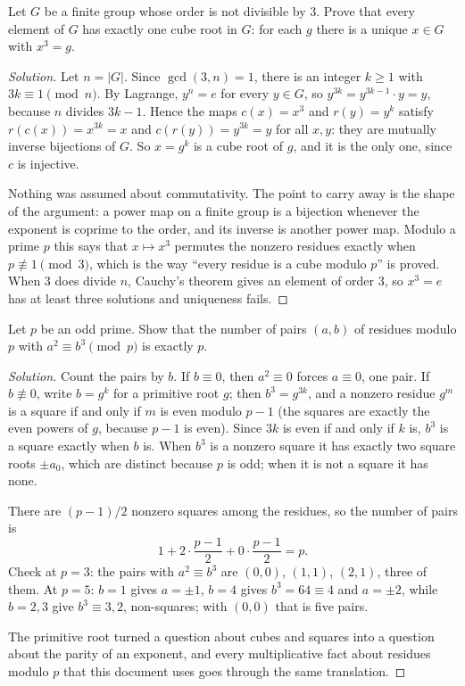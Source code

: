 \begin{example}
Let $G$ be a finite group whose order is not divisible by $3$. Prove that every element of $G$ has exactly one cube root in $G$: for each $g$ there is a unique $x\in G$ with $x^3=g$.
\end{example}

\begin{proof}[Solution]
Let $n=|G|$. Since $\gcd(3,n)=1$, there is an integer $k\ge1$ with $3k\equiv1\pmod n$. By Lagrange, $y^n=e$ for every $y\in G$, so $y^{3k}=y^{3k-1}\cdot y=y$, because $n$ divides $3k-1$. Hence the maps $c(x)=x^3$ and $r(y)=y^k$ satisfy $r(c(x))=x^{3k}=x$ and $c(r(y))=y^{3k}=y$ for all $x,y$: they are mutually inverse bijections of $G$. So $x=g^k$ is a cube root of $g$, and it is the only one, since $c$ is injective.

Nothing was assumed about commutativity. The point to carry away is the shape of the argument: a power map on a finite group is a bijection whenever the exponent is coprime to the order, and its inverse is another power map. Modulo a prime $p$ this says that $x\mapsto x^3$ permutes the nonzero residues exactly when $p\not\equiv1\pmod3$, which is the way ``every residue is a cube modulo $p$'' is proved. When $3$ does divide $n$, Cauchy's theorem gives an element of order $3$, so $x^3=e$ has at least three solutions and uniqueness fails.
\end{proof}

\begin{example}
Let $p$ be an odd prime. Show that the number of pairs $(a,b)$ of residues modulo $p$ with $a^2\equiv b^3\pmod p$ is exactly $p$.
\end{example}

\begin{proof}[Solution]
Count the pairs by $b$. If $b\equiv0$, then $a^2\equiv0$ forces $a\equiv0$, one pair. If $b\not\equiv0$, write $b=g^k$ for a primitive root $g$; then $b^3=g^{3k}$, and a nonzero residue $g^m$ is a square if and only if $m$ is even modulo $p-1$ (the squares are exactly the even powers of $g$, because $p-1$ is even). Since $3k$ is even if and only if $k$ is, $b^3$ is a square exactly when $b$ is. When $b^3$ is a nonzero square it has exactly two square roots $\pm a_0$, which are distinct because $p$ is odd; when it is not a square it has none.

There are $(p-1)/2$ nonzero squares among the residues, so the number of pairs is
\[
1+2\cdot\frac{p-1}{2}+0\cdot\frac{p-1}{2}=p .
\]
Check at $p=3$: the pairs with $a^2\equiv b^3$ are $(0,0)$, $(1,1)$, $(2,1)$, three of them. At $p=5$: $b=1$ gives $a=\pm1$, $b=4$ gives $b^3=64\equiv4$ and $a=\pm2$, while $b=2,3$ give $b^3\equiv3,2$, non-squares; with $(0,0)$ that is five pairs.

The primitive root turned a question about cubes and squares into a question about the parity of an exponent, and every multiplicative fact about residues modulo $p$ that this document uses goes through the same translation.
\end{proof}

